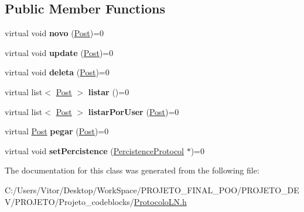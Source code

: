 \subsection*{Public Member Functions}
\begin{DoxyCompactItemize}
\item 
\hypertarget{class_post_protocol_a29c8f475d6c5f284ad94d51aeaf0428a}{virtual void {\bfseries novo} (\hyperlink{class_post}{Post})=0}\label{class_post_protocol_a29c8f475d6c5f284ad94d51aeaf0428a}

\item 
\hypertarget{class_post_protocol_a7cac627996f60cc8d3a3ac79541906da}{virtual void {\bfseries update} (\hyperlink{class_post}{Post})=0}\label{class_post_protocol_a7cac627996f60cc8d3a3ac79541906da}

\item 
\hypertarget{class_post_protocol_ada9f6161a46b9adf85b404785e18becd}{virtual void {\bfseries deleta} (\hyperlink{class_post}{Post})=0}\label{class_post_protocol_ada9f6161a46b9adf85b404785e18becd}

\item 
\hypertarget{class_post_protocol_a590d2c0f349b99a33e69661fffdc078e}{virtual list$<$ \hyperlink{class_post}{Post} $>$ {\bfseries listar} ()=0}\label{class_post_protocol_a590d2c0f349b99a33e69661fffdc078e}

\item 
\hypertarget{class_post_protocol_addfc8f6b5ffd5af04f0ef6a1a3b7d8f1}{virtual list$<$ \hyperlink{class_post}{Post} $>$ {\bfseries listar\-Por\-User} (\hyperlink{class_post}{Post})=0}\label{class_post_protocol_addfc8f6b5ffd5af04f0ef6a1a3b7d8f1}

\item 
\hypertarget{class_post_protocol_a6455f6e36f21ba008e3529e77185d884}{virtual \hyperlink{class_post}{Post} {\bfseries pegar} (\hyperlink{class_post}{Post})=0}\label{class_post_protocol_a6455f6e36f21ba008e3529e77185d884}

\item 
\hypertarget{class_post_protocol_a9ed7d312b4726aba6bc880d90ec844a7}{virtual void {\bfseries set\-Percistence} (\hyperlink{class_percistence_protocol}{Percistence\-Protocol} $\ast$)=0}\label{class_post_protocol_a9ed7d312b4726aba6bc880d90ec844a7}

\end{DoxyCompactItemize}


The documentation for this class was generated from the following file\-:\begin{DoxyCompactItemize}
\item 
C\-:/\-Users/\-Vitor/\-Desktop/\-Work\-Space/\-P\-R\-O\-J\-E\-T\-O\-\_\-\-F\-I\-N\-A\-L\-\_\-\-P\-O\-O/\-P\-R\-O\-J\-E\-T\-O\-\_\-\-D\-E\-V/\-P\-R\-O\-J\-E\-T\-O/\-Projeto\-\_\-codeblocks/\hyperlink{_protocolo_l_n_8h}{Protocolo\-L\-N.\-h}\end{DoxyCompactItemize}
